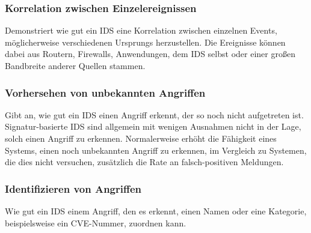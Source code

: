 \subsubsection{Korrelation zwischen Einzelereignissen }
Demonstriert wie gut ein IDS eine Korrelation zwischen einzelnen Events, möglicherweise verschiedenen Ursprungs herzustellen. Die Ereignisse können dabei aus Routern, Firewalls, Anwendungen, dem IDS selbst oder einer großen Bandbreite anderer Quellen stammen.
\subsubsection{Vorhersehen von unbekannten Angriffen}
Gibt an, wie gut ein IDS einen Angriff erkennt, der so noch nicht aufgetreten ist. Signatur-basierte IDS sind allgemein mit wenigen Ausnahmen nicht in der Lage, solch einen Angriff zu erkennen. Normalerweise erhöht die Fähigkeit eines Systems, einen noch unbekannten Angriff zu erkennen, im Vergleich zu Systemen, die dies nicht versuchen, zusätzlich die Rate an falsch-positiven Meldungen.
\subsubsection{Identifizieren von Angriffen}
Wie gut ein IDS einem Angriff, den es erkennt, einen Namen oder eine Kategorie, beispielsweise ein CVE-Nummer, zuordnen kann.
